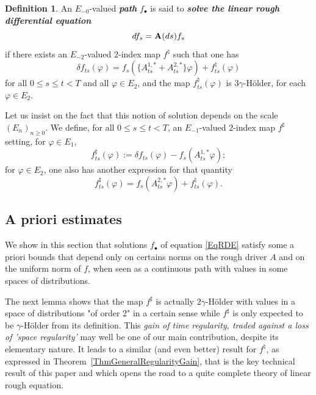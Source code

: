 \documentclass[11pt,a4paper]{amsart}
\renewcommand{\leq}{\leqslant}
\renewcommand{\geq}{\geqslant}
\theoremstyle{plain}%
\theoremstyle{definition}
\newtheorem{definition}[theorem]{Definition}
\theoremstyle{remark}
\numberwithin{equation}{section} %
\begin{document}
\begin{definition}
\label{DefnSolutionEquation}
An $E_{-0}$-valued \emph{\textbf{path}} $f_\bullet$ is said to \emph{\textbf{solve the linear rough differential equation}}
\begin{equation}
\label{EqRDE}
df_s = {\bf A}(ds)f_s
\end{equation}
if there exists an $E_{-2}$-valued $2$-index map $f^\natural$ such that one has
\begin{equation}
\label{EqDefnSolutionRDE}
\delta f_{ts}(\varphi) = f_s(\{A^{1,*}_{ts}+A^{2,*}_{ts}\}\varphi) + f^\natural_{ts}(\varphi)
\end{equation}
for all $0\leq s\leq t<T$ and all $\varphi\in E_2$, and the map $f^\natural_{ts}(\varphi)$ is $3\gamma$-H\"older, for each $\varphi\in E_2$.
\end{definition}

\smallskip

Let us insist on the fact that this notion of solution depends on the scale $(E_n)_{n\geq 0}$. We define, for all $0\leq s\leq t<T$, an  $E_{-1}$-valued $2$-index map $f^\sharp$ setting, for $\varphi\in E_1$,
\begin{equation*}
f^\sharp_{ts}(\varphi) := \delta f_{ts}(\varphi) - f_s(A_{ts}^{1,*} \varphi);
\end{equation*}
for $\varphi\in E_2$, one also has another expression for that quantity
$$
f^\sharp_{ts}(\varphi) = f_s(A^{2,*}_{ts}\varphi) + f^\natural_{ts}(\varphi).
$$


\bigskip


\subsection{A priori estimates}
\label{SubsectionAPrioriEstimates}

We show in this section that solutions $f_\bullet$ of equation \eqref{EqRDE} satisfy some a priori bounds that depend only on certains norms on the rough driver $A$ and on the uniform norm of $f$, when seen as a continuous path with values in some spaces of distributions. 

\smallskip

The next lemma shows that the map $f^\sharp$ is actually $2\gamma$-H\"older with values in a  space of distributions "of order 2" in a certain sense while $f^\sharp$ is only expected to be $\gamma$-H\"older from its definition. This \textit{gain of time regularity, traded against a loss of 'space regularity'} may well be one of our main contribution, despite its elementary nature. It leads to a similar (and even better) result for $f^\natural$, as expressed in Theorem~\ref{ThmGeneralRegularityGain}, that is the key technical result of this paper and which opens the road  to a quite complete theory of linear rough equation.
\end{document}
